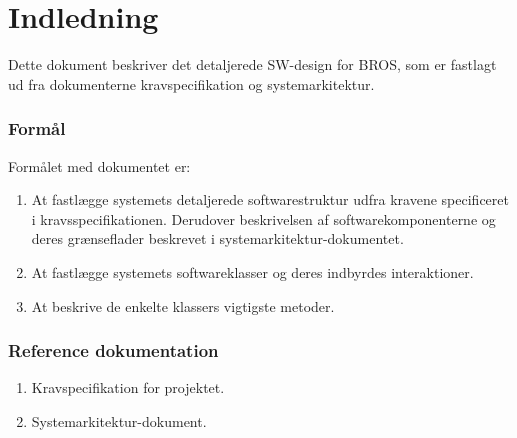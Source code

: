 \chapter{Indledning}
Dette dokument beskriver det detaljerede SW-design for BROS, som er fastlagt ud fra dokumenterne kravspecifikation og systemarkitektur.
\subsection{Formål}
Formålet med dokumentet er:\\
\begin{enumerate}[$\bullet$]
\item At fastlægge systemets detaljerede softwarestruktur udfra kravene specificeret i kravsspecifikationen. Derudover beskrivelsen af softwarekomponenterne og deres grænseflader beskrevet i systemarkitektur-dokumentet.
\item At fastlægge systemets softwareklasser og deres indbyrdes interaktioner.
\item At beskrive de enkelte klassers vigtigste metoder.
\end{enumerate}
\subsection{Reference dokumentation}
\begin{enumerate}[$\bullet$]
\item Kravspecifikation for projektet.
\item Systemarkitektur-dokument.
\end{enumerate}
